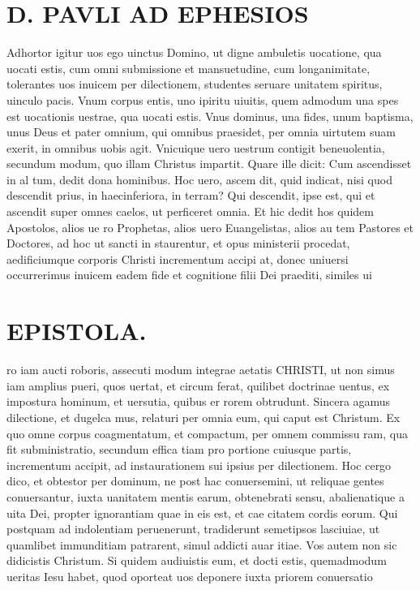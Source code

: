 \documentclass{article}
\begin{document}
\begin{pages}
\section*{D. PAVLI AD EPHESIOS }
\marginpar{[ p.2. ]}
\marginpar{[ p.3.  ]}
\marginpar{[ p.4.  ]}\pstart Adhortor igitur uos ego uinctus Domino, ut digne ambuletis uocatione, qua uocati estis, cum omni submissione et mansuetudine, cum longanimitate, tolerantes uos inuicem per dilectionem, studentes seruare unitatem spiritus, uinculo pacis.  \pend\pstart Vnum corpus entis, uno ipiritu uiuitis, quem admodum una spes est uocationis uestrae, qua uocati estis. Vnus dominus, una fides, unum baptisma, unus Deus et pater omnium, qui omnibus praesidet, per omnia uirtutem suam exerit, in omnibus uobis agit.  \pend\pstart Vnicuique  uero uestrum contigit beneuolentia, secundum modum, quo illam Christus impartit. Quare ille dicit: Cum ascendisset in al tum, dedit dona hominibus. Hoc uero, ascem dit, quid indicat, nisi quod descendit prius, in haecinferiora, in terram? Qui descendit, ipse est, qui et ascendit super omnes caelos, ut perficeret omnia.  \pend\pstart Et hic dedit hos quidem Apostolos, alios ue ro Prophetas, alios uero Euangelistas, alios au tem Pastores et Doctores, ad hoc ut sancti in staurentur, et opus ministerii procedat, aedificiumque  corporis Christi incrementum accipi at, donec uniuersi occurrerimus inuicem eadem fide et cognitione filii Dei praediti, similes ui  \pend
\section*{EPISTOLA.  }
\marginpar{[ p.13 ]}
\marginpar{[ p.5.  ]}
\marginpar{[ p.6.  ]}
\marginpar{[ p.7.  ]}\pstart ro iam aucti roboris, assecuti modum integrae aetatis CHRISTI, ut non simus iam amplius pueri, quos uertat, et circum ferat, quilibet doctrinae uentus, ex impostura hominum, et uersutia, quibus er rorem obtrudunt.  \pend\pstart Sincera agamus dilectione, et dugelca mus, relaturi per omnia eum, qui caput est Christum. Ex quo omne corpus coagmentatum, et compactum, per omnem commissu ram, qua fit subministratio, secundum effica tiam pro portione cuiusque  partis, incrementum accipit, ad instaurationem sui ipsius per dilectionem.   \pend\pstart Hoc cergo dico, et obtestor per dominum, ne post hac conuersemini, ut reliquae gentes conuersantur, iuxta uanitatem mentis earum, obtenebrati sensu, abalienatique  a uita Dei, propter ignorantiam quae in eis est, et cae citatem cordis eorum. Qui postquam ad indolentiam peruenerunt, tradiderunt semetipsos lasciuiae, ut quamlibet immunditiam patrarent, simul addicti auar itiae.  \pend\pstart Vos autem non sic didicistis Christum. Si quidem audiuistis eum, et docti estis, quemadmodum ueritas Iesu habet, quod oporteat uos deponere iuxta priorem conuersatio\pend

\end{pages}
\end{document}
